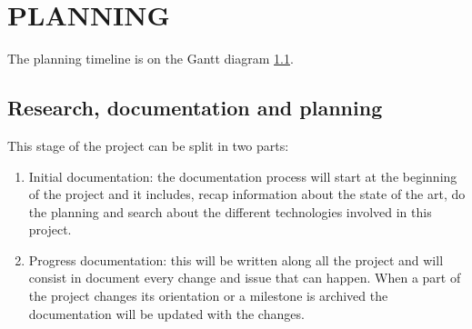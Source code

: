 \documentclass[10pt,a4paper,twocolumn,twoside]{article}
\begin{document}
\section{PLANNING}
\label{sec:planning}
The planning timeline is on the Gantt diagram \ref{}.
\subsection{Research, documentation and planning}
This stage of the project can be split in two parts:
\begin{enumerate}
	\item Initial documentation: the documentation process will start at the beginning of the project and it includes, recap information about the state of the art, do the planning and search about the different technologies involved in this project. 
	
	\item Progress documentation: this will be written along all the project and will consist in document every change and issue that can happen. When a part of the project changes its orientation or a milestone is archived the documentation will be updated with the changes. 
\end{enumerate}
\end{document}
